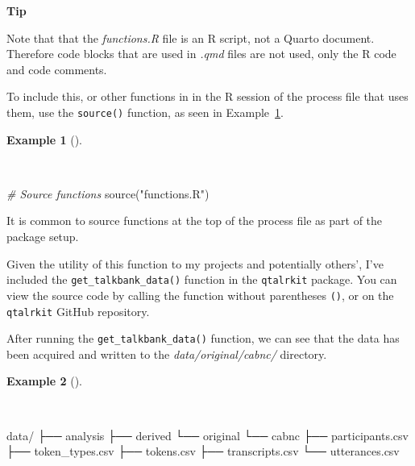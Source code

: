 \documentclass[
  letterpaper,
]{latex/krantz}
\newenvironment{Shaded}{\begin{snugshade}}{\end{snugshade}}
\newcommand{\CommentTok}[1]{\textcolor[rgb]{0.00,0.00,0.00}{\textit{#1}}}
\newcommand{\ExtensionTok}[1]{\textcolor[rgb]{0.00,0.00,0.00}{#1}}
\newcommand{\FunctionTok}[1]{\textcolor[rgb]{0.00,0.00,0.00}{#1}}
\newcommand{\NormalTok}[1]{\textcolor[rgb]{0.00,0.00,0.00}{#1}}
\newcommand{\StringTok}[1]{\textcolor[rgb]{0.00,0.00,0.00}{#1}}
\theoremstyle{definition}
\newtheorem{example}{Example}[chapter]
\theoremstyle{remark}
\begin{document}
\begin{tcolorbox}[enhanced jigsaw, toprule=.15mm, breakable, colback=white, opacityback=0, leftrule=.75mm, bottomrule=.15mm, colframe=quarto-callout-color-frame, left=2mm, arc=.35mm, rightrule=.15mm]

\textbf{ Tip}

Note that that the \emph{functions.R} file is an R script, not a Quarto
document. Therefore code blocks that are used in \emph{.qmd} files are
not used, only the R code and code comments.

\end{tcolorbox}

To include this, or other functions in in the R session of the process
file that uses them, use the \texttt{source()} function, as seen in
Example~\ref{exm-ad-source-functions}.

\begin{example}[]\protect\hypertarget{exm-ad-source-functions}{}\label{exm-ad-source-functions}

~

\begin{Shaded}
\begin{Highlighting}[]
\CommentTok{\# Source functions}
\FunctionTok{source}\NormalTok{(}\StringTok{"functions.R"}\NormalTok{)}
\end{Highlighting}
\end{Shaded}

\end{example}

It is common to source functions at the top of the process file as part
of the package setup.

Given the utility of this function to my projects and potentially
others', I've included the \texttt{get\_talkbank\_data()} function in
the \texttt{qtalrkit} package. You can view the source code by calling
the function without parentheses \texttt{()}, or on the
\texttt{qtalrkit} GitHub repository.

After running the \texttt{get\_talkbank\_data()} function, we can see
that the data has been acquired and written to the
\emph{data/original/cabnc/} directory.

\begin{example}[]\protect\hypertarget{exm-ad-functions-r}{}\label{exm-ad-functions-r}

~

\begin{Shaded}
\begin{Highlighting}[]
\ExtensionTok{data/}
\ExtensionTok{├──}\NormalTok{ analysis}
\ExtensionTok{├──}\NormalTok{ derived}
\ExtensionTok{└──}\NormalTok{ original}
    \ExtensionTok{└──}\NormalTok{ cabnc}
        \ExtensionTok{├──}\NormalTok{ participants.csv}
        \ExtensionTok{├──}\NormalTok{ token\_types.csv}
        \ExtensionTok{├──}\NormalTok{ tokens.csv}
        \ExtensionTok{├──}\NormalTok{ transcripts.csv}
        \ExtensionTok{└──}\NormalTok{ utterances.csv}
\end{Highlighting}
\end{Shaded}

\end{example}
\end{document}
